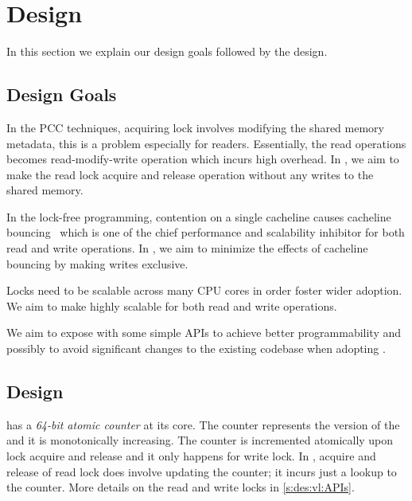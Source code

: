 \section{Design}
\label{s:des}

In this section we explain our design goals followed by the \sys design.

\subsection{Design Goals}
\label{s:des:goals}

In the PCC techniques, acquiring lock involves modifying the shared memory
metadata, this is a problem especially for readers. Essentially, the read
operations becomes read-modify-write operation which incurs high overhead. 
In \sys, we aim to make the read lock acquire and release operation without any
writes to the shared memory.

In the lock-free programming, contention on a single cacheline causes cacheline
bouncing~\cite{} which is one of the chief performance and scalability
inhibitor for both read and write operations. In \sys, we aim to minimize the
effects of cacheline bouncing by making writes exclusive. 

Locks need to be scalable across many CPU cores in order foster wider adoption.
We aim to make \sys highly scalable for both read and write operations.

We aim to expose \sys with some simple APIs to achieve better programmability
and possibly to avoid significant changes to the existing codebase when adopting
\sys. 

\subsection{\sys Design}
\label{s:des:vl}

\sys has a \emph{64-bit atomic counter} at its core. The counter represents the
version of the \sys and it is monotonically increasing. The counter is
incremented atomically upon lock acquire and release and it only happens for
write lock. In \sys, acquire and release of read lock does involve updating the
counter; it incurs just a lookup to the counter. More details on the read and
write locks in \autoref{s:des:vl:APIs}. 

